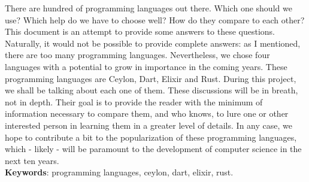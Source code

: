 \documentclass{abnt}
\begin{document}





 

\capa
\folhaderosto

\begin{resumo}
There are hundred of programming languages out there. Which one should we use?
Which help do we have to choose well? How do they compare to each other? This
document is an attempt to provide some answers to these questions. Naturally, it
would not be possible to provide complete answers: as I mentioned, there are too
many programming languages. Nevertheless, we chose four languages with a
potential to grow in importance in the coming years. These programming languages
are Ceylon, Dart, Elixir and Rust. During this project, we shall be
talking about each one of them. These discussions will be in breath, not in
depth. Their goal is to provide the reader with the minimum of information
necessary to compare them, and who knows, to lure one or other interested person
in learning them in a greater level of details. In any case, we hope to
contribute a bit to the popularization of these programming languages, which -
likely - will be paramount to the development of computer science in the next
ten years.\\

\textbf{Keywords}: programming languages, ceylon, dart, elixir, rust.
\end{resumo}

\sumario %
\listoffigures %

\end{document}
